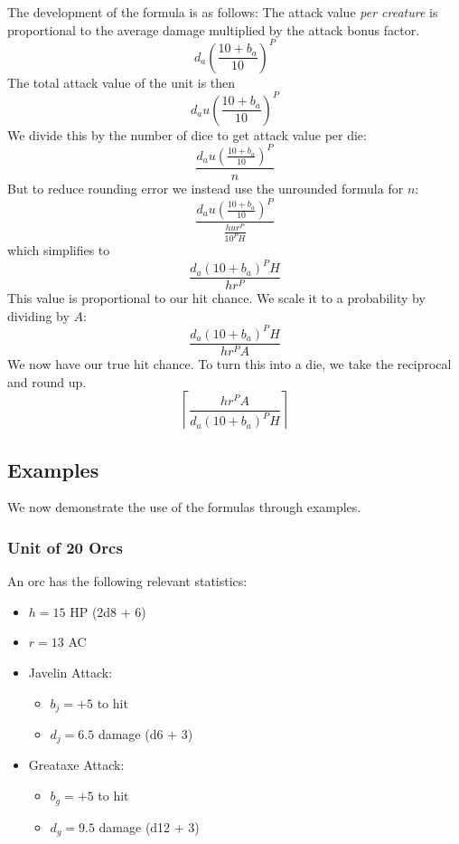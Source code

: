 \documentclass{article}
\begin{document}
The development of the formula is as follows:
The attack value \emph{per creature} is proportional to
the average damage multiplied by the attack bonus factor.
\[
    d_a \left(\frac{10 + b_{a}}{10}\right)^{P}
\]
The total attack value of the unit is then 
\[
    d_a u \left(\frac{10 + b_{a}}{10}\right)^{P}
\]
We divide this by the number of dice to get attack value per die: 
\[
    \frac
        {d_a u \left(\frac{10 + b_{a}}{10}\right)^{P}}
        {n}
\]
But to reduce rounding error we instead use the unrounded formula for $n$: 
\[
    \frac
        {d_a u \left(\frac{10 + b_{a}}{10}\right)^{P}}
        {\frac{h u r^P}{10^P H}}
\]
which simplifies to 
\[
    \frac
        {d_a (10 + b_{a})^P H}
        {h r^P}
\]
This value is proportional to our hit chance.
We scale it to a probability by dividing by $A$:
\[
    \frac
        {d_a (10 + b_{a})^P H}
        {h r^P A}
\]
We now have our true hit chance.
To turn this into a die, we take the reciprocal and round up.
\[
    \left\lceil
        \frac
            {h r^P A}
            {d_a (10 + b_{a})^P H}
    \right\rceil
\]

\subsection{Examples}

We now demonstrate the use of the formulas through examples.

\subsubsection{Unit of 20 Orcs}

An orc has the following relevant statistics:
\begin{itemize}
    \item $h = 15$ HP (2d8 + 6)
    \item $r = 13$ AC
    \item Javelin Attack:
        \begin{itemize}
            \item $b_j = +5$ to hit
            \item $d_j = 6.5$ damage (d6 + 3)
        \end{itemize}
    \item Greataxe Attack:
        \begin{itemize}
            \item $b_g = +5$ to hit
            \item $d_g = 9.5$ damage (d12 + 3)
        \end{itemize}
\end{itemize}
\end{document}
